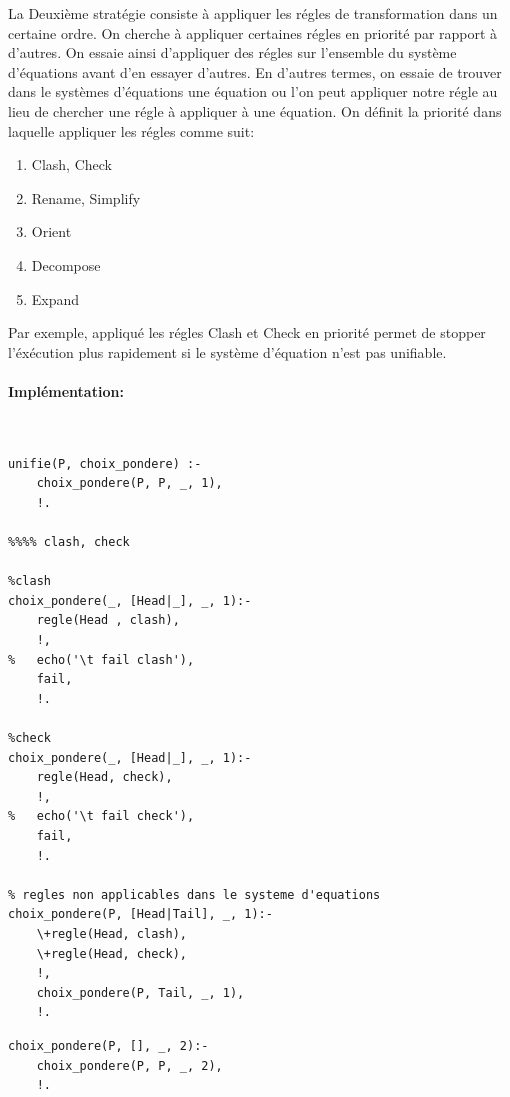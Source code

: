 \documentclass[10pt,a4paper]{report}
\begin{document}
La Deuxième stratégie consiste à appliquer les régles de transformation dans un certaine ordre. On cherche à appliquer certaines régles en priorité par rapport à d'autres. On essaie ainsi d'appliquer des régles sur l'ensemble du système d'équations avant d'en essayer d'autres. En d'autres termes, on essaie de trouver dans le systèmes d'équations une équation ou l'on peut appliquer notre régle au lieu de chercher une régle à appliquer à une équation.
\newline
On définit la priorité dans laquelle appliquer les régles comme suit:

\begin{enumerate}
  \item Clash, Check
  \item Rename, Simplify
  \item Orient
  \item Decompose
  \item Expand
\end{enumerate}
Par exemple, appliqué les régles Clash et Check en priorité permet de stopper l'éxécution plus rapidement si le système d'équation n'est pas unifiable.
\newline

\paragraph{Implémentation:} ~\\

\begin{lstlisting}[caption ={Stratégie choix pondere dans $main.pl$ avec les régles de poids 1}]
% unification choix pondere
unifie(P, choix_pondere) :-
	choix_pondere(P, P, _, 1),
	!.
	
%%%% clash, check

%clash
choix_pondere(_, [Head|_], _, 1):-
	regle(Head , clash),
	!,
%	echo('\t fail clash'),
	fail,
	!.

%check
choix_pondere(_, [Head|_], _, 1):-
	regle(Head, check),
	!,
%	echo('\t fail check'),
	fail,
	!.

% regles non applicables dans le systeme d'equations
choix_pondere(P, [Head|Tail], _, 1):-
	\+regle(Head, clash),
	\+regle(Head, check),
	!,
	choix_pondere(P, Tail, _, 1),
	!.
\end{lstlisting}

\begin{lstlisting}[caption ={Stratégie choix pondere dans $main.pl$, passage aux régles de poids 1 }]
choix_pondere(P, [], _, 2):-
	choix_pondere(P, P, _, 2),
	!.
\end{lstlisting}
\end{document}
